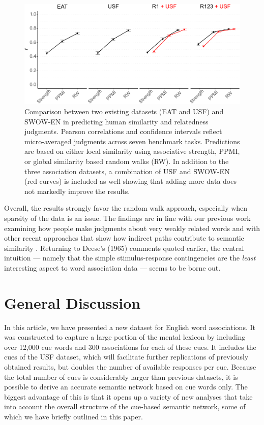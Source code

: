 \documentclass[a4paper,doc,natbib,floatsintext]{apa6}
\begin{document}
\begin{figure}[!ht]
\centering
\includegraphics[width=12cm]{figures/SimilarityDatasets.pdf}
\caption{Comparison between two existing datasets (EAT and USF) and SWOW-EN in predicting human similarity and relatedness judgments. Pearson correlations and confidence intervals reflect micro-averaged judgments across seven benchmark tasks. Predictions are based on either local similarity using associative strength, PPMI, or global similarity based random walks (RW). In addition to the three association datasets, a combination of USF and SWOW-EN (red curves) is included as well showing that adding more data does not markedly improve the results.} \label{figure:SWOWUSFEAT}
\end{figure}

Overall, the results strongly favor the random walk approach, especially when sparsity of the data is an issue. The findings are in line with our previous work examining how people make judgments about very weakly related words \citep{DeDeyne2016JEP} and with other recent approaches that show how indirect paths contribute to semantic similarity \citep{KenettEffi2017}. Returning to Deese's (1965) comments quoted earlier, the central intuition --- namely that the simple stimulus-response contingencies are the {\it least} interesting aspect to word association data --- seems to be borne out.


\section{General Discussion}

In this article, we have presented a new dataset for English word associations. It was constructed to capture a large portion of the mental lexicon by including over 12,000 cue words and 300 associations for each of these cues. It includes the cues of the USF dataset, which will facilitate further replications of previously obtained results, but doubles the number of available responses per cue. Because the total number of cues is considerably larger than previous datasets, it is possible to derive an accurate semantic network based on cue words only. The biggest advantage of this is that it opens up a variety of new analyses that take into account the overall structure of the cue-based  semantic network, some of which we have briefly outlined in this paper.
\end{document}

